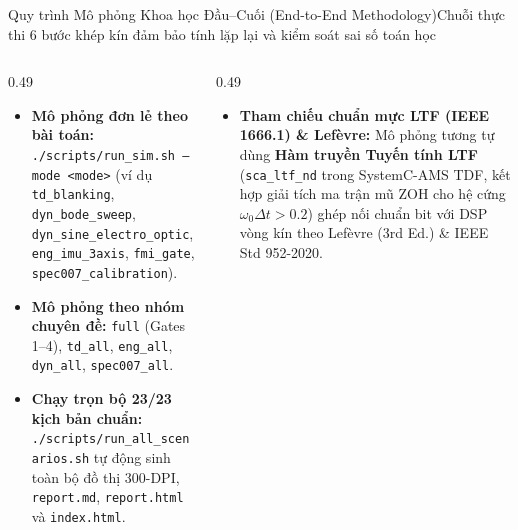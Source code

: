 \documentclass[aspectratio=169,8pt]{beamer}
\begin{document}
\begin{frame}{Quy trình Mô phỏng Khoa học Đầu–Cuối (End-to-End Methodology)}{Chuỗi thực thi 6 bước khép kín đảm bảo tính lặp lại và kiểm soát sai số toán học}
\begin{center}
\end{center}

\vspace{0.18cm}
\begin{columns}[T]
  \begin{column}{0.49\textwidth}
    \begin{eqbox}
      \begin{itemize}\setlength\itemsep{2.5pt}
        \item \textbf{Mô phỏng đơn lẻ theo bài toán:} \texttt{./scripts/run\_sim.sh --mode <mode>} (ví dụ \texttt{td\_blanking}, \texttt{dyn\_bode\_sweep}, \texttt{dyn\_sine\_electro\_optic}, \texttt{eng\_imu\_3axis}, \texttt{fmi\_gate}, \texttt{spec007\_calibration}).
        \item \textbf{Mô phỏng theo nhóm chuyên đề:} \texttt{full} (Gates 1--4), \texttt{td\_all}, \texttt{eng\_all}, \texttt{dyn\_all}, \texttt{spec007\_all}.
        \item \textbf{Chạy trọn bộ 23/23 kịch bản chuẩn:} \texttt{./scripts/run\_all\_scenarios.sh} tự động sinh toàn bộ đồ thị 300-DPI, \texttt{report.md}, \texttt{report.html} và \texttt{index.html}.
      \end{itemize}
    \end{eqbox}
  \end{column}
  \begin{column}{0.49\textwidth}
    \begin{remarkbox}
      \begin{itemize}\setlength\itemsep{2.0pt}
        \item \textbf{Tham chiếu chuẩn mực LTF (IEEE 1666.1) \& Lefèvre:} Mô phỏng tương tự dùng \textbf{Hàm truyền Tuyến tính LTF} (\texttt{sca\_ltf\_nd} trong SystemC-AMS TDF, kết hợp giải tích ma trận mũ ZOH cho hệ cứng $\omega_0\Delta t>0.2$) ghép nối chuẩn bit với DSP vòng kín theo Lefèvre (3rd Ed.) \& IEEE Std 952-2020.

\end{itemize}
\end{remarkbox}
\end{column}
\end{columns}
\end{frame}
\end{document}
